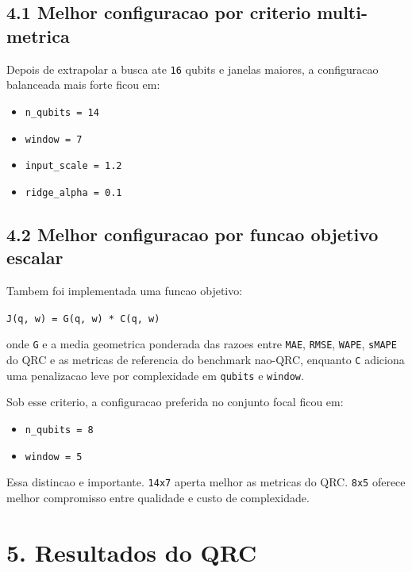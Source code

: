 \documentclass[12pt]{article}
\providecommand{\tightlist}{%
  \setlength{\itemsep}{0pt}\setlength{\parskip}{0pt}}
\begin{document}
\subsection{4.1 Melhor configuracao por criterio multi-metrica}\label{41-melhor-configuracao-por-criterio-multi-metrica}

Depois de extrapolar a busca ate \texttt{16} qubits e janelas maiores, a configuracao balanceada mais forte ficou em:

\begin{itemize}
\tightlist
\item
  \texttt{n\_qubits\ =\ 14}
\item
  \texttt{window\ =\ 7}
\item
  \texttt{input\_scale\ =\ 1.2}
\item
  \texttt{ridge\_alpha\ =\ 0.1}
\end{itemize}

\subsection{4.2 Melhor configuracao por funcao objetivo escalar}\label{42-melhor-configuracao-por-funcao-objetivo-escalar}

Tambem foi implementada uma funcao objetivo:

\texttt{J(q,\ w)\ =\ G(q,\ w)\ *\ C(q,\ w)}

onde \texttt{G} e a media geometrica ponderada das razoes entre \texttt{MAE}, \texttt{RMSE}, \texttt{WAPE}, \texttt{sMAPE} do QRC e as metricas de referencia do benchmark nao-QRC, enquanto \texttt{C} adiciona uma penalizacao leve por complexidade em \texttt{qubits} e \texttt{window}.

Sob esse criterio, a configuracao preferida no conjunto focal ficou em:

\begin{itemize}
\tightlist
\item
  \texttt{n\_qubits\ =\ 8}
\item
  \texttt{window\ =\ 5}
\end{itemize}

Essa distincao e importante. \texttt{14x7} aperta melhor as metricas do QRC. \texttt{8x5} oferece melhor compromisso entre qualidade e custo de complexidade.

\section{5. Resultados do QRC}\label{5-resultados-do-qrc}
\end{document}

